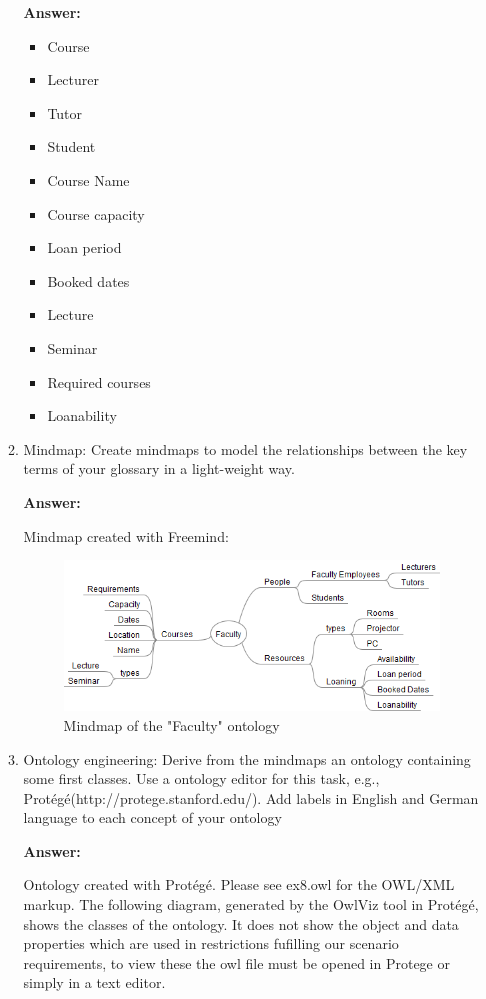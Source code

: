 \documentclass[10pt,a4paper]{article}
\begin{document}
\begin{enumerate}
\begin{enumerate}
\textbf{Answer:}

\begin{itemize}
\item Course
\item Lecturer
\item Tutor
\item Student
\item Course Name
\item Course capacity
\item Loan period
\item Booked dates
\item Lecture 
\item Seminar
\item Required courses
\item Loanability
\end{itemize}

\item Mindmap: Create mindmaps to model the relationships between the key terms of your glossary in a light-weight way.

\textbf{Answer:}

Mindmap created with Freemind:

\begin{figure}[H]
  \caption{Mindmap of the "Faculty" ontology}
  \centering
    \includegraphics[scale=0.7]{Faculty_mindmap.png}
\end{figure}

\item Ontology engineering: Derive from the mindmaps an ontology containing some first classes. Use a ontology editor for this task, e.g., Protégé(http://protege.stanford.edu/). Add labels in English and German language to each concept of your ontology

\textbf{Answer:}

Ontology created with Protégé. Please see ex8.owl for the OWL/XML markup. The following diagram, generated by the OwlViz tool in Protégé, shows the classes of the ontology. It does not show the object and data properties which are used in restrictions fufilling our scenario requirements, to view these the owl file must be opened in Protege or simply in a text editor.


\end{enumerate}
\end{enumerate}
\end{document}
